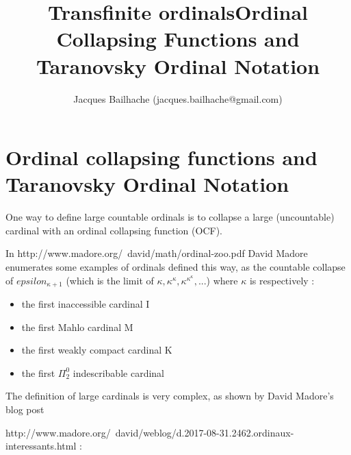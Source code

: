 \documentclass[10pt]{article}
\title{Transfinite ordinals}
\begin{document}
\title{Ordinal Collapsing Functions and Taranovsky Ordinal Notation}
\author{Jacques Bailhache (jacques.bailhache@gmail.com)}

\maketitle

\setlength{\parindent}{0pt}

\section{Ordinal collapsing functions and Taranovsky Ordinal Notation}

One way to define large countable ordinals is to collapse a large (uncountable) cardinal with an ordinal collapsing function (OCF).

In http://www.madore.org/~david/math/ordinal-zoo.pdf David Madore enumerates some examples of ordinals defined this way, as the countable collapse of $epsilon_{\kappa+1}$ (which is the limit of $\kappa, \kappa^\kappa, \kappa^{\kappa^\kappa}, ...$) where $\kappa$ is respectively :

\begin{itemize}
 \item the first inaccessible cardinal I
 \item the first Mahlo cardinal M
 \item the first weakly compact cardinal K
 \item the first $\Pi^0_2$ indescribable cardinal
\end{itemize}

 The definition of large cardinals is very complex, as shown by David Madore's blog post 
 
 http://www.madore.org/~david/weblog/d.2017-08-31.2462.ordinaux-interessants.html :
 
\bigskip

\newenvironment{changemargin}[2]{\begin{list}{}{%
\setlength{\topsep}{0pt}%
\setlength{\leftmargin}{0pt}%
\setlength{\rightmargin}{0pt}%
\setlength{\listparindent}{\parindent}%
\setlength{\itemindent}{\parindent}%
\setlength{\parsep}{0pt plus 1pt}%
\addtolength{\leftmargin}{#1}%
\addtolength{\rightmargin}{#2}%
}\item }{\end{list}}
\end{document}
